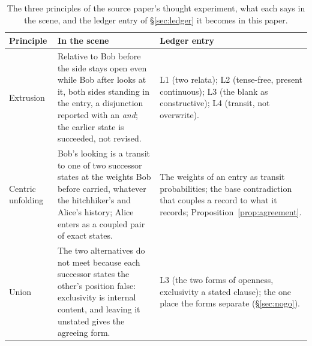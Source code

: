 \begin{table}[htbp]
\centering
\caption{The three principles of the source paper's thought experiment, what each says in the scene, and the ledger entry of \S\ref{sec:ledger} it becomes in this paper.}
\label{tab:hitchhiker}
\small
\begin{tabular}{p{} p{} p{}}
\toprule
\textbf{Principle} & \textbf{In the scene} & \textbf{Ledger entry} \\
\midrule
Extrusion & Relative to Bob before the side stays open even while Bob after looks at it, both sides standing in the entry, a disjunction reported with an \emph{and}; the earlier state is succeeded, not revised. & L1 (two relata); L2 (tense-free, present continuous); L3 (the blank as constructive); L4 (transit, not overwrite). \\
Centric unfolding & Bob's looking is a transit to one of two successor states at the weights Bob before carried, whatever the hitchhiker's and Alice's history; Alice enters as a coupled pair of exact states. & The weights of an entry as transit probabilities; the base contradiction that couples a record to what it records; Proposition~\ref{prop:agreement}. \\
Union & The two alternatives do not meet because each successor states the other's position false: exclusivity is internal content, and leaving it unstated gives the agreeing form. & L3 (the two forms of openness, exclusivity a stated clause); the one place the forms separate (\S\ref{sec:nogo}). \\
\bottomrule
\end{tabular}
\end{table}

